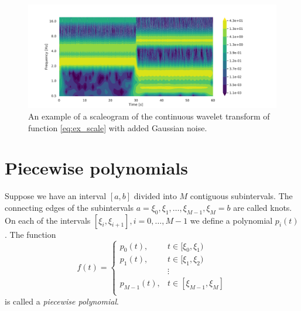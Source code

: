 \documentclass[a4paper]{memoir}
\theoremstyle{plain}
\theoremstyle{definition}
\theoremstyle{remark}
\begin{document}
\begin{figure}[tb]
        \centering
        \includegraphics[width=\linewidth]{./code/figures/scaleogram_example.pdf}
        \caption{An example of a scaleogram of the continuous wavelet transform of function \eqref{eq:ex_scale} with added Gaussian noise.}
        \label{fig:scaleogram_ex}
\end{figure}



\section{Piecewise polynomials}
Suppose we have an interval $[a,b]$ divided into $M$ contiguous subintervals.
The connecting edges of the subintervals $a = \xi_0, \xi_1, \hdots, \xi_{M - 1}, \xi_{M} = b$ are called knots.
On each of the intervals $[\xi_i, \xi_{i+1}], i = 0, \hdots, M-1$ we define a polynomial $p_i (t)$.
The function
\begin{equation*}
        f(t) = 
                \begin{cases}
                        p_0(t), &  t \in [\xi_0, \xi_{1}) \\
                        p_1(t), & t \in [\xi_1, \xi_2)  \\
                        & \vdots \\
                        p_{M-1}(t), & t \in [\xi_{M-1}, \xi_{M}]  \\
                \end{cases}
\end{equation*}
is called a \textit{piecewise polynomial}.
\end{document}
